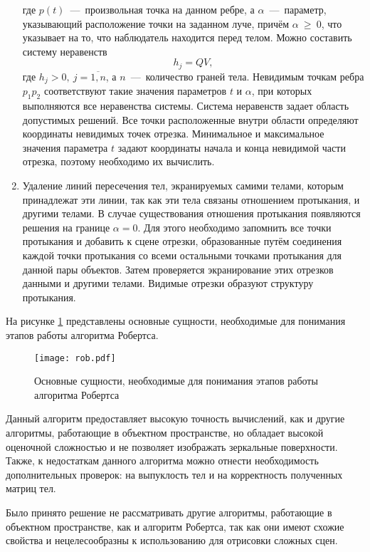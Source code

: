 \begin{enumerate}[label={\arabic*)}]
\begin{equation}
	\end{equation}
	где $p(t)$~---~произвольная точка на данном ребре, а $\alpha$~---~параметр, указывающий расположение точки на заданном луче, причём $\alpha~\ge~0$, что указывает на то, что наблюдатель находится перед телом. Можно составить систему неравенств \begin{equation}
		h_j = QV,
	\end{equation}
	где $h_j > 0,\ j = \overline{1,n}$, а $n$~---~количество граней тела.
	Невидимым точкам ребра $p_1p_2$ соответствуют такие значения параметров $t$ и $\alpha$, при которых выполняются все неравенства системы. Система неравенств задает область допустимых решений. Все точки расположенные внутри области определяют координаты невидимых точек отрезка. Минимальное и максимальное значения параметра $t$ задают координаты начала и конца невидимой части отрезка, поэтому необходимо их вычислить.
	\item Удаление линий пересечения тел, экранируемых самими телами, которым принадлежат эти линии, так как эти тела связаны отношением протыкания, и другими телами. В случае существования отношения протыкания появляются решения на границе $\alpha = 0$. Для этого необходимо запомнить все точки протыкания и добавить к сцене отрезки, образованные путём соединения каждой точки протыкания со всеми остальными точками протыкания для данной пары объектов. Затем проверяется экранирование этих отрезков данными и другими телами. Видимые отрезки образуют структуру протыкания.
\end{enumerate}

На рисунке \ref{img:rob} представлены основные сущности, необходимые для понимания этапов работы алгоритма Робертса.

\begin{figure}[h!]
    \centering
    \texttt{[image: rob.pdf]}
    \caption{Основные сущности, необходимые для понимания этапов работы алгоритма Робертса}
    \label{img:rob}
\end{figure}

Данный алгоритм предоставляет высокую точность вычислений, как и другие алгоритмы, работающие в объектном пространстве, но обладает высокой оценочной сложностью и не позволяет изображать зеркальные поверхности. Также, к недостаткам данного алгоритма можно отнести необходимость дополнительных проверок: на выпуклость тел и на корректность полученных матриц тел. 

Было принято решение не рассматривать другие алгоритмы, работающие в объектном пространстве, как и алгоритм Робертса, так как они имеют схожие свойства и нецелесообразны к использованию для отрисовки сложных сцен.

